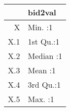 \begin{table}[ht]
\centering
\begin{tabular}{rl}
  \hline
 &    bid2val \\ 
  \hline
X & Min.   :1   \\ 
  X.1 & 1st Qu.:1   \\ 
  X.2 & Median :1   \\ 
  X.3 & Mean   :1   \\ 
  X.4 & 3rd Qu.:1   \\ 
  X.5 & Max.   :1   \\ 
   \hline
\end{tabular}
\end{table}
